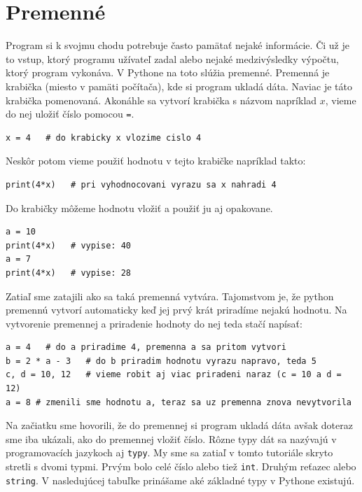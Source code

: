 \documentclass{article}
\begin{document}
\section{Premenné}

Program si k svojmu chodu potrebuje často pamätať nejaké informácie. Či už je to vstup, ktorý programu užívateľ zadal alebo nejaké medzivýsledky výpočtu, ktorý program vykonáva. V Pythone na toto slúžia premenné. Premenná je krabička (miesto v pamäti počítača), kde si program ukladá dáta. Naviac je táto krabička pomenovaná. Akonáhle sa vytvorí krabička s názvom napríklad $x$, vieme do nej uložiť číslo pomocou \texttt{=}.

\begin{lstlisting}
x = 4   # do krabicky x vlozime cislo 4
\end{lstlisting}

Neskôr potom vieme použiť hodnotu v tejto krabičke napríklad takto:

\begin{lstlisting}
print(4*x)   # pri vyhodnocovani vyrazu sa x nahradi 4
\end{lstlisting}

Do krabičky môžeme hodnotu vložiť a použiť ju aj opakovane.

\begin{lstlisting}
a = 10
print(4*x)   # vypise: 40
a = 7
print(4*x)   # vypise: 28
\end{lstlisting}

Zatiaľ sme zatajili ako sa taká premenná vytvára. Tajomstvom je, že python premennú vytvorí automaticky keď jej prvý krát priradíme nejakú hodnotu. Na vytvorenie premennej a priradenie hodnoty do nej teda stačí napísať:

\begin{lstlisting}
a = 4   # do a priradime 4, premenna a sa pritom vytvori
b = 2 * a - 3   # do b priradim hodnotu vyrazu napravo, teda 5
c, d = 10, 12   # vieme robit aj viac priradeni naraz (c = 10 a d = 12)
a = 8 # zmenili sme hodnotu a, teraz sa uz premenna znova nevytvorila
\end{lstlisting}

Na začiatku sme hovorili, že do premennej si program ukladá dáta avšak doteraz sme iba ukázali, ako do premennej vložiť číslo. Rôzne typy dát sa nazývajú v programovacích jazykoch aj \texttt{typy}. My sme sa zatiaľ v tomto tutoriále skryto stretli s dvomi typmi. Prvým bolo celé číslo alebo tiež \texttt{int}. Druhým reťazec alebo \texttt{string}. V nasledujúcej tabuľke prinášame aké základné typy v Pythone existujú.
\end{document}
